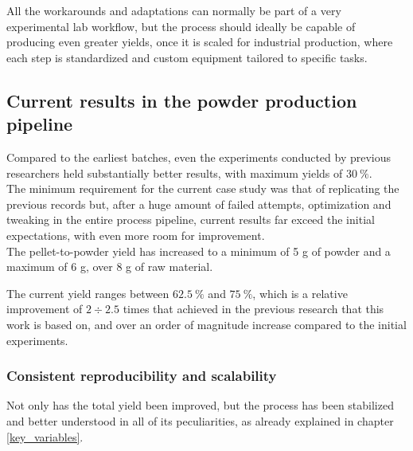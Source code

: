 \documentclass{article}
\begin{document}
        
        All the workarounds and adaptations can normally be part of a very experimental lab workflow, but the process should ideally 
        be capable of producing even greater yields, once it is scaled for industrial production, where each step is standardized 
        and custom equipment tailored to specific tasks. 

        \subsection{Current results in the powder production pipeline \label{promising_results}}

        Compared to the earliest batches, even the experiments conducted by previous researchers held substantially better 
        results, with maximum yields of $30 \ \%$. \\ 

        The minimum requirement for the current case study was that of replicating the previous records but, after 
        a huge amount of failed attempts, optimization and tweaking in the entire process pipeline, current results 
        far exceed the initial expectations, with even more room for improvement. \\ 

        The pellet-to-powder yield has increased to a minimum of 5 g of powder and a maximum of 6 g, over 8 g of raw material. 

        The current yield ranges between $62.5 \ \%$ and $75 \ \%$, which is a relative improvement of $2 \div 2.5$ times that 
        achieved in the previous research that this work is based on, and over an order of magnitude increase compared to the 
        initial experiments. \\ 
%
%

        \subsubsection{Consistent reproducibility and scalability\label{consistent_reproducibility}}

        Not only has the total yield been improved, but the process has been stabilized and better understood in all of its 
        peculiarities, as already explained in chapter \ref{key_variables}. 
\end{document}
